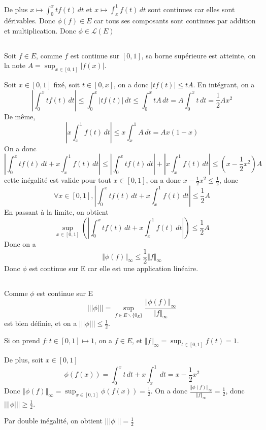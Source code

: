 \documentclass[a4paper,12pt]{book}
\begin{document}
De plus $x \mapsto \int_0^x t f(t)\,dt$ et $x \mapsto \int_x^1 f(t)\,dt$ sont continues car elles sont dérivables. 
Donc $\phi(f) \in E$  car tous ses composants sont continues par addition et multiplication. Donc $\boxed{\phi \in \mathcal{L}(E)}$

\subsection{}
Soit $f \in E$, comme $f$ est continue sur $[0,1]$, sa borne supérieure est atteinte, on la note $A=\sup_{x \in [0,1]}|f(x)|$.

Soit $x \in [0,1]$ fixé, soit $t \in [0,x]$, on a donc $|tf(t)|\leq tA$. En intégrant, on a 
$$
\left|\int_0^x tf(t)\,dt\right| \leq\int_0^x |tf(t)|\,dt \leq \int_0^x tA\,dt=A\int_0^x t\,dt=\frac{1}{2}Ax^2
$$
De même, 
$$
\left|x\int_x^1f(t)\,dt\right|\leq x\int_x^1A\,dt=Ax(1-x)
$$
On a donc 
$$
\left|\int_0^x t f(t)\,dt+x\int_x^1f(t)\,dt\right| \leq \left|\int_0^x t f(t)\,dt\right|+\left|x\int_x^1f(t)\,dt\right| \leq (x-\frac{1}{2}x^2)A
$$
cette inégalité est valide pour tout $x \in [0,1]$, on a donc $x-\frac{1}{2}x^2\leq \frac{1}{2}$, donc 
$$
\forall x \in [0,1],\left|\int_0^x t f(t)\,dt+x\int_x^1f(t)\,dt\right| \leq \frac{1}{2}A
$$
En passant à la limite, on obtient 
$$
\sup_{x \in [0,1]}\left(\left|\int_0^x t f(t)\,dt+x\int_x^1f(t)\,dt\right|\right) \leq \frac{1}{2}A
$$
Donc on a 
$$
\Vert \phi(f)\Vert_\infty \leq \frac{1}{2} \Vert f \Vert_\infty
$$
Donc $\phi$ est continue sur E car elle est une application linéaire. 

\subsection{}
Comme $\phi$ est continue sur E
$$
|||\phi|||=\sup_{f \in E \backslash \{0_E\}} \frac{\Vert \phi(f)\Vert_\infty}{\Vert f \Vert_\infty}
$$
est bien définie, et on a $|||\phi|||\leq \frac{1}{2}$. 

Si on prend $f: t\in[0,1] \mapsto 1$, on a $f\in E$, et $\Vert f \Vert_\infty=\sup_{t \in [0,1]}f(t)=1$. 

De plus, soit $x \in [0,1]$
$$
\phi(f(x))=\int_0^x t\,dt+x\int_x^1\,dt=x-\frac{1}{2}x^2
$$
Donc $\Vert \phi(f)\Vert_\infty=\sup_{x \in [0,1]}\phi(f(x))=\frac{1}{2}$. On a donc $\frac{\Vert \phi(f)\Vert_\infty}{\Vert f \Vert_\infty}=\frac{1}{2}$, donc $|||\phi|||\geq \frac{1}{2}$. 

Par double inégalité, on obtient $\boxed{|||\phi|||= \frac{1}{2}}$


 
\end{document}
